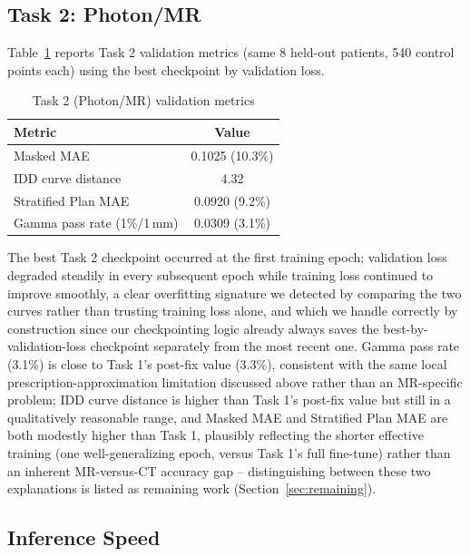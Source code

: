 \documentclass[10pt,conference]{IEEEtran}
\begin{document}
\subsection{Task 2: Photon/MR}

Table~\ref{tab:t2} reports Task 2 validation metrics (same 8 held-out
patients, 540 control points each) using the best checkpoint by
validation loss.

\begin{table}[!t]
\centering
\caption{Task 2 (Photon/MR) validation metrics}
\label{tab:t2}
\begin{tabular}{@{}lc@{}}
\toprule
Metric & Value \\
\midrule
Masked MAE                    & 0.1025 (10.3\%) \\
IDD curve distance             & 4.32 \\
Stratified Plan MAE           & 0.0920 (9.2\%) \\
Gamma pass rate (1\%/1\,mm)   & 0.0309 (3.1\%) \\
\bottomrule
\end{tabular}
\end{table}

The best Task 2 checkpoint occurred at the first training epoch;
validation loss degraded steadily in every subsequent epoch while
training loss continued to improve smoothly, a clear overfitting
signature we detected by comparing the two curves rather than trusting
training loss alone, and which we handle correctly by construction
since our checkpointing logic already always saves the
best-by-validation-loss checkpoint separately from the most recent one.
Gamma pass rate (3.1\%) is close to Task 1's post-fix value (3.3\%),
consistent with the same local prescription-approximation limitation
discussed above rather than an MR-specific problem; IDD curve distance
is higher than Task 1's post-fix value but still in a qualitatively
reasonable range, and Masked MAE and Stratified Plan MAE are both modestly
higher than Task 1, plausibly reflecting the shorter effective training
(one well-generalizing epoch, versus Task 1's full fine-tune) rather
than an inherent MR-versus-CT accuracy gap -- distinguishing between
these two explanations is listed as remaining work
(Section~\ref{sec:remaining}).

\subsection{Inference Speed}
\end{document}
